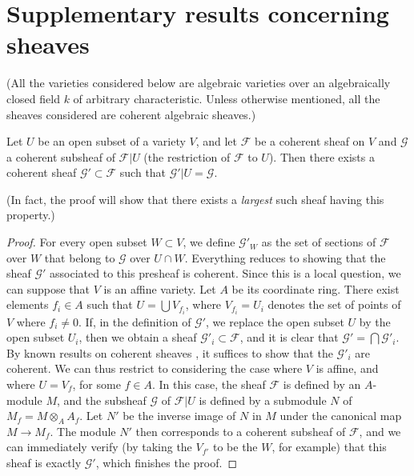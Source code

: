 \documentclass{article}
\theoremstyle{plain}
\newenvironment{proposition}[1]
    {\renewcommand\theinnercustomproposition{#1}\innercustomproposition}
    {\endinnercustomproposition}
\theoremstyle{definition}
\newcommand{\sh}[1]{{\mathscr{#1}}}
\newcommand{\oldpage}[1]{\marginpar{\footnotesize$\Big\vert$ \textit{p.~#1}}}
\begin{document}
\section{Supplementary results concerning sheaves}
\label{section1}

(All the varieties considered below are algebraic varieties over an algebraically closed field $k$ of arbitrary characteristic. Unless otherwise mentioned, all the sheaves considered are coherent algebraic sheaves.)

\begin{proposition}{1}
\label{proposition1}
\oldpage{98}
  Let $U$ be an open subset of a variety $V$, and let $\sh{F}$ be a coherent sheaf on $V$ and $\sh{G}$ a coherent subsheaf of $\sh{F}|U$ (the restriction of $\sh{F}$ to $U$).
  Then there exists a coherent sheaf $\sh{G}'\subset\sh{F}$ such that $\sh{G}'|U=\sh{G}$.
\end{proposition}

(In fact, the proof will show that there exists a \emph{largest} such sheaf having this property.)

\begin{proof}
  For every open subset $W\subset V$, we define $\sh{G}'_W$ as the set of sections of $\sh{F}$ over $W$ that belong to $\sh{G}$ over $U\cap W$.
  Everything reduces to showing that the sheaf $\sh{G}'$ associated to this presheaf is coherent.
  Since this is a local question, we can suppose that $V$ is an affine variety.
  Let $A$ be its coordinate ring.
  There exist elements $f_i\in A$ such that $U=\bigcup V_{f_i}$, where $V_{f_i}=U_i$ denotes the set of points of $V$ where $f_i\neq0$.
  If, in the definition of $\sh{G}'$, we replace the open subset $U$ by the open subset $U_i$, then we obtain a sheaf $\sh{G}'_i\subset\sh{F}$, and it is clear that $\sh{G}'=\bigcap\sh{G}'_i$.
  By known results on coherent sheaves \cite[p.~209]{12}, it suffices to show that the $\sh{G}'_i$ are coherent.
  We can thus restrict to considering the case where $V$ is affine, and where $U=V_f$, for some $f\in A$.
  In this case, the sheaf $\sh{F}$ is defined by an $A$-module $M$, and the subsheaf $\sh{G}$ of $\sh{F}|U$ is defined by a submodule $N$ of $M_f=M\otimes_A A_f$.
  Let $N'$ be the inverse image of $N$ in $M$ under the canonical map $M\to M_f$.
  The module $N'$ then corresponds to a coherent subsheaf of $\sh{F}$, and we can immediately verify (by taking the $V_{f'}$ to be the $W$, for example) that this sheaf is exactly $\sh{G}'$, which finishes the proof.
\end{proof}
\end{document}
